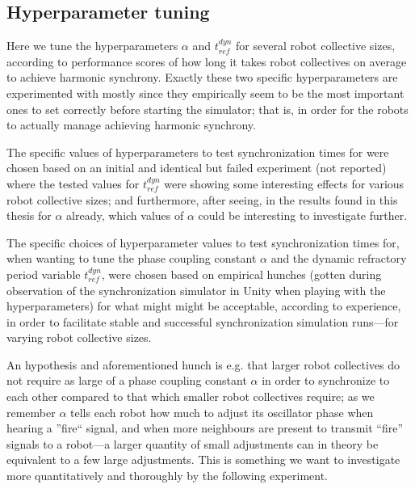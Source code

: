 	
	\subsection{Hyperparameter tuning}
	
	Here we tune the hyperparameters $\alpha$ and $t_{ref}^{dyn}$ for several robot collective sizes, according to performance scores of how long it takes robot collectives on average to achieve harmonic synchrony. Exactly these two specific hyperparameters are experimented with mostly since they empirically seem to be the most important ones to set correctly before starting the simulator; that is, in order for the robots to actually manage achieving harmonic synchrony. 
	
	The specific values of hyperparameters to test synchronization times for were chosen based on an initial and identical but failed experiment (not reported) where the tested values for $t_{ref}^{dyn}$ were showing some interesting effects for various robot collective sizes; and furthermore, after seeing, in the results found in this thesis for $\alpha$ already, which values of $\alpha$ could be interesting to investigate further.
	
	The specific choices of hyperparameter values to test synchronization times for, when wanting to tune the phase coupling constant $\alpha$ and the dynamic refractory period variable $t_{ref}^{dyn}$, were chosen based on empirical hunches (gotten during observation of the synchronization simulator in Unity when playing with the hyperparameters) for what might might be acceptable, according to experience, in order to facilitate stable and successful synchronization simulation runs—for varying robot collective sizes. 
	
	An hypothesis and aforementioned hunch is e.g. that larger robot collectives do not require as large of a phase coupling constant $\alpha$ in order to synchronize to each other compared to that which smaller robot collectives require; as we remember $\alpha$ tells each robot how much to adjust its oscillator phase when hearing a ''fire`` signal, and when more neighbours are present to transmit ``fire'' signals to a robot—a larger quantity of small adjustments can in theory be equivalent to a few large adjustments. This is something we want to investigate more quantitatively and thoroughly by the following experiment.
	

